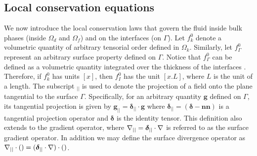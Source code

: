 \subsection{Local conservation equations}
\label{sec:local_eq}
We now introduce the local conservation laws that govern the fluid inside bulk phases (inside $\Omega_d$ and $\Omega_f$) and on the interfaces (on $\Gamma$). 
Let $f_k^0$ denote a volumetric quantity of arbitrary tensorial order defined in $\Omega_k$.
Similarly, let $f_\Gamma^0$ represent an arbitrary surface property defined on $\Gamma$. 
Notice that $f_\Gamma^0$ can be defined as a volumetric quantity integrated over the thickness of the interfaces \citet[Chapter 2]{ishii2010thermo}. 
Therefore, if $f_k^0$ has units $[x]$, then $f_I^0$ has the unit $[x.L]$, where $L$ is the unit of a length. 
The subscript $_{||}$ is used to denote the projection of a field onto the plane tangential to the surface $\Gamma$. Specifically, for an arbitrary quantity $\textbf{g}$ defined on $\Gamma$, its tangential projection is given by $\textbf{g}_{||} = \bm\delta_{||}\cdot \textbf{g}$ where $\bm\delta_{||} = (\bm\delta-\textbf{nn})$ is a tangential projection operator and $\bm\delta$ is the identity tensor. 
This definition also extends to the gradient operator, where $\mathbf{\nabla}_{||}= \bm\delta _{||}\cdot \mathbf{\nabla}$ is referred to as the surface gradient operator. In addition we may define the surface divergence operator as $\mathbf{\nabla}_{||} \cdot ()= (\bm\delta _{||}\cdot \mathbf{\nabla})\cdot()$.


